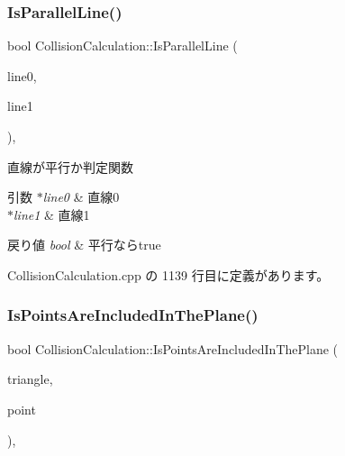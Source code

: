 \subsubsection{\texorpdfstring{Is\+Parallel\+Line()}{IsParallelLine()}}
{\footnotesize\ttfamily bool Collision\+Calculation\+::\+Is\+Parallel\+Line (\begin{DoxyParamCaption}\item[{\mbox{\hyperlink{class_line_segment}{Line\+Segment}} $\ast$}]{line0,  }\item[{\mbox{\hyperlink{class_line_segment}{Line\+Segment}} $\ast$}]{line1 }\end{DoxyParamCaption})\hspace{0.3cm}{\ttfamily [static]}, {\ttfamily [private]}}



直線が平行か判定関数 


\begin{DoxyParams}{引数}
{\em $\ast$line0} & 直線0 \\
\hline
{\em $\ast$line1} & 直線1 \\
\hline
\end{DoxyParams}

\begin{DoxyRetVals}{戻り値}
{\em bool} & 平行ならtrue \\
\hline
\end{DoxyRetVals}


 Collision\+Calculation.\+cpp の 1139 行目に定義があります。

\mbox{\label{class_collision_calculation_a05b47fd8be9f41d50a2650d94b0067fe}} 
\subsubsection{\texorpdfstring{Is\+Points\+Are\+Included\+In\+The\+Plane()}{IsPointsAreIncludedInThePlane()}}
{\footnotesize\ttfamily bool Collision\+Calculation\+::\+Is\+Points\+Are\+Included\+In\+The\+Plane (\begin{DoxyParamCaption}\item[{\mbox{\hyperlink{class_triangle}{Triangle}} $\ast$}]{triangle,  }\item[{\mbox{\hyperlink{class_vector3_d}{Vector3D}} $\ast$}]{point }\end{DoxyParamCaption})\hspace{0.3cm}{\ttfamily [static]}, {\ttfamily [private]}}



